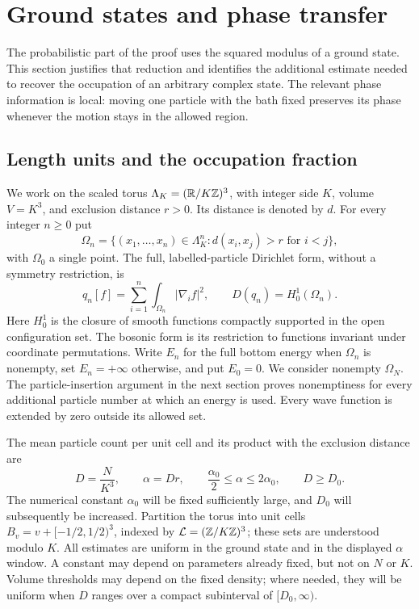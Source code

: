 \section{Ground states and phase transfer}\label{setup:section}

The probabilistic part of the proof uses the squared modulus of a ground
state. This section justifies that reduction and identifies the additional
estimate needed to recover the occupation of an arbitrary complex state.
The relevant phase information is local: moving one particle with the bath
fixed preserves its phase whenever the motion stays in the allowed region.

\subsection{Length units and the occupation fraction}

We work on the scaled torus $\Lambda_K=(\mathbb R/K\mathbb Z)^3$, with integer side
$K$, volume $V=K^3$, and exclusion distance $r>0$. Its distance is denoted
by $d$. For every integer $n\ge0$ put
\[
 \Omega_n=\{(x_1,\ldots,x_n)\in\Lambda_K^n:
                    d(x_i,x_j)>r\text{ for }i<j\},
\]
with $\Omega_0$ a single point. The full, labelled-particle Dirichlet form,
without a symmetry restriction, is
\[
 q_n[f]=\sum_{i=1}^n\int_{\Omega_n}|\nabla_i f|^2,
 \qquad D(q_n)=H_0^1(\Omega_n).
\]
Here $H_0^1$ is the closure of smooth functions compactly supported in the
open configuration set. The bosonic form is its restriction to functions
invariant under coordinate permutations. Write $E_n$ for the full bottom
energy when $\Omega_n$ is nonempty, set $E_n=+\infty$ otherwise, and
put $E_0=0$. We consider nonempty $\Omega_N$. The particle-insertion
argument in the next section proves nonemptiness for every additional
particle number at which an energy is used. Every wave function is
extended by zero outside its allowed set.

The mean particle count per unit cell and its product with the exclusion
distance are
\begin{equation}\label{setup:scales}
 D=\frac{N}{K^3},\qquad \alpha=Dr,
 \qquad \frac{\alpha_0}{2}\le\alpha\le2\alpha_0,
 \qquad D\ge D_0.
\end{equation}
The numerical constant $\alpha_0$ will be fixed sufficiently large, and
$D_0$ will subsequently be increased. Partition the torus into unit cells
$B_v=v+[-1/2,1/2)^3$, indexed by
$\mathcal L=(\mathbb Z/K\mathbb Z)^3$; these sets are understood modulo $K$.
All estimates are uniform in the ground state and in the displayed
$\alpha$ window. A constant may depend on parameters already fixed, but
not on $N$ or $K$. Volume thresholds may depend on the fixed density;
where needed, they will be uniform when $D$ ranges over a compact
subinterval of $[D_0,\infty)$.

